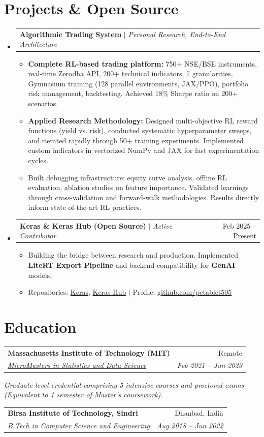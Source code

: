 \documentclass[10pt, letterpaper]{article}
\makeatletter
\newcommand{\resumeItem}[1]{
  \item\small{
    {#1 \vspace{-2pt}}
  }
}
\newcommand{\resumeSubheading}[4]{
  \vspace{-1pt}\item
    \begin{tabular*}{0.98\textwidth}[t]{l@{\extracolsep{\fill}}r}
      \textbf{#1} & {\small\color{darkgray} #2} \\
      \textit{\small#3} & \textit{\small\color{darkgray} #4} \\
    \end{tabular*}\vspace{-7pt}
}
\newcommand{\resumeProjectHeading}[2]{
    \item
    \begin{tabular*}{0.98\textwidth}{l@{\extracolsep{\fill}}r}
      \small#1 & #2 \\
    \end{tabular*}\vspace{-7pt}
}
\newcommand{\resumeSubHeadingListStart}{\begin{itemize}[leftmargin=0.15in, label={}]}
\newcommand{\resumeSubHeadingListEnd}{\end{itemize}}
\newcommand{\resumeItemListStart}{\begin{itemize}}
\newcommand{\resumeItemListEnd}{\end{itemize}\vspace{-5pt}}
\makeatother
\begin{document}
\section{Projects \& Open Source}
  \resumeSubHeadingListStart
    \resumeProjectHeading
      {\textbf{Algorithmic Trading System} $|$ \emph{Personal Research, End-to-End Architecture}}{}
      \resumeItemListStart
        \resumeItem{\textbf{Complete RL-based trading platform:} 750+ NSE/BSE instruments, real-time Zerodha API, 200+ technical indicators, 7 granularities, Gymnasium training (128 parallel environments, JAX/PPO), portfolio risk management, backtesting. Achieved 18\% Sharpe ratio on 200+ scenarios.}
        \resumeItem{\textbf{Applied Research Methodology:} Designed multi-objective RL reward functions (yield vs. risk), conducted systematic hyperparameter sweeps, and iterated rapidly through 50+ training experiments. Implemented custom indicators in vectorized NumPy and JAX for fast experimentation cycles.}
        \resumeItem{Built debugging infrastructure: equity curve analysis, offline RL evaluation, ablation studies on feature importance. Validated learnings through cross-validation and forward-walk methodologies. Results directly inform state-of-the-art RL practices.}
      \resumeItemListEnd

    \resumeProjectHeading
      {\textbf{Keras \& Keras Hub (Open Source)} $|$ \emph{Active Contributor}}{Feb 2025 -- Present}
      \resumeItemListStart
        \resumeItem{Building the bridge between research and production. Implemented \textbf{LiteRT Export Pipeline} and backend compatibility for \textbf{GenAI} models.}
        \resumeItem{Repositories: \href{https://github.com/keras-team/keras}{Keras}, \href{https://github.com/keras-team/keras-hub}{Keras Hub} $|$ Profile: \href{https://github.com/pctablet505}{\color{midnightblue}github.com/pctablet505}}
      \resumeItemListEnd
      
  \resumeSubHeadingListEnd

\section{Education}
  \resumeSubHeadingListStart
    \resumeSubheading
      {Massachusetts Institute of Technology (MIT)}{Remote}
      {\href{https://micromasters.mit.edu/ds}{MicroMasters in Statistics and Data Science}}{Feb 2021 -- Jun 2023}
      \vspace{-4pt}
      \small{\item{\textit{Graduate-level credential comprising 5 intensive courses and proctored exams (Equivalent to 1 semester of Master's coursework).}}}
    \resumeSubheading
      {Birsa Institute of Technology, Sindri}{Dhanbad, India}
      {B.Tech in Computer Science and Engineering}{Aug 2018 -- Jun 2022}
  \resumeSubHeadingListEnd
\end{document}
